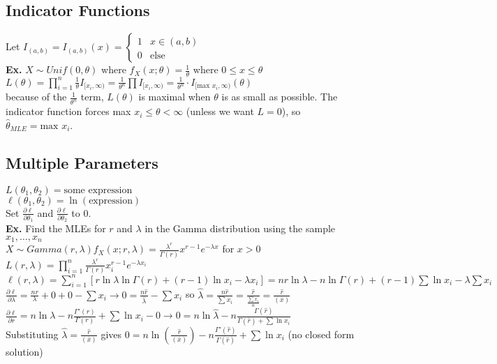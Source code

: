 \documentclass{article}
\begin{document}
\subsection{Indicator Functions}
Let $I_{(a,b)}=I_{(a,b)}(x)=\begin{cases}
    1&x\in(a,b)\\
    0&\text{else}
\end{cases}$\\
\textbf{Ex.} $X\sim Unif(0,\theta)$ where $f_X(x;\theta)=\frac{1}{\theta}$ where $0\leq x\leq\theta$\\
$L(\theta)=\prod_{i=1}^n\frac{1}{\theta}I_{[x_i,\infty)}=\frac{1}{\theta^n}\prod I_{[x_i,\infty)}=\frac{1}{\theta^n}\cdot I_{[\text{max }x_i,\infty)}(\theta)$\\
because of the $\frac{1}{\theta^n}$ term, $L(\theta)$ is maximal when $\theta$ is as small as possible. The indicator function forces max $x_i\leq\theta<\infty$ (unless we want $L=0$), so $\hat\theta_{MLE}=\text{max }x_i$.
\subsection{Multiple Parameters}
$L(\theta_1,\theta_2) = \text{some expression}$\\
$\ell(\theta_1,\theta_2)= \ln(\text{expression})$\\
Set $\frac{\partial\ell}{\partial\theta_1}$ and $\frac{\partial\ell}{\partial\theta_2}$ to $0$.\\
\textbf{Ex.} Find the MLEs for $r$ and $\lambda$ in the Gamma distribution using the sample $x_1,\dots,x_n$\\
$X\sim Gamma(r,\lambda)$\hspace*{0.25in}$f_X(x;r,\lambda)=\frac{\lambda^r}{\Gamma(r)}x^{r-1}e^{-\lambda x}$ for $x>0$\\
$L(r,\lambda)=\prod_{i=1}^n\frac{\lambda^r}{\Gamma(r)}x_i^{r-1}e^{-\lambda x_i}$\\
$\ell(r,\lambda)=\sum_{i=1}^n[r\ln\lambda\ln\Gamma(r)+(r-1)\ln x_i-\lambda x_i]=nr\ln\lambda-n\ln\Gamma(r)+(r-1)\sum\ln x_i-\lambda\sum x_i$\\
$\frac{\partial\ell}{\partial\lambda}=\frac{nr}{\lambda}+0+0-\sum x_i \rightarrow 0=\frac{n\hat r}{\hat\lambda}-\sum x_i$ so $\hat\lambda=\frac{n\hat r}{\sum x_i}=\frac{\hat r}{\frac{\sum x_i}{n}}=\frac{\hat r}{(\bar x)}$\\
$\frac{\partial\ell}{\partial r}=n\ln\lambda-n\frac{\Gamma'(r)}{\Gamma(r)}+\sum\ln x_i-0 \rightarrow 0=n\ln\hat\lambda-n\frac{\Gamma(\hat r)}{\Gamma(\hat r)+\sum\ln x_i}$\\
Substituting $\hat\lambda=\frac{\hat r}{(\bar x)}$ gives $0=n\ln (\frac{\hat r}{(\bar x)})-n\frac{\Gamma'(\hat r)}{\Gamma(\hat r)}+\sum\ln x_i$ (no closed form solution)
\end{document}
